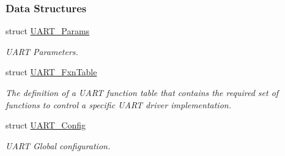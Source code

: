 \subsubsection*{Data Structures}
\begin{DoxyCompactItemize}
\item 
struct \hyperlink{struct_u_a_r_t___params}{U\+A\+R\+T\+\_\+\+Params}
\begin{DoxyCompactList}\small\item\em U\+A\+R\+T Parameters. \end{DoxyCompactList}\item 
struct \hyperlink{struct_u_a_r_t___fxn_table}{U\+A\+R\+T\+\_\+\+Fxn\+Table}
\begin{DoxyCompactList}\small\item\em The definition of a U\+A\+R\+T function table that contains the required set of functions to control a specific U\+A\+R\+T driver implementation. \end{DoxyCompactList}\item 
struct \hyperlink{struct_u_a_r_t___config}{U\+A\+R\+T\+\_\+\+Config}
\begin{DoxyCompactList}\small\item\em U\+A\+R\+T Global configuration. \end{DoxyCompactList}\end{DoxyCompactItemize}
